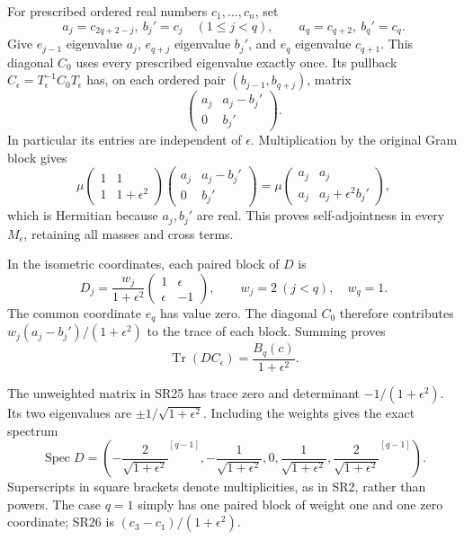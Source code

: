 For prescribed ordered real numbers \(c_1,\ldots,c_n\), set \[
a_j=c_{2q+2-j},\ b_j'=c_j\quad(1\le j<q),\qquad
a_q=c_{q+2},\ b_q'=c_q.
\tag{SR22}
\] Give \(e_{j-1}\) eigenvalue \(a_j\), \(e_{q+j}\) eigenvalue \(b_j'\), and \(e_q\) eigenvalue \(c_{q+1}\). This diagonal \(C_0\) uses every prescribed eigenvalue exactly once. Its pullback \(C_\epsilon=T_\epsilon^{-1}C_0T_\epsilon\) has, on each ordered pair \((b_{j-1},b_{q+j})\), matrix \[
\begin{pmatrix}a_j&a_j-b_j'\\0&b_j'\end{pmatrix}.
\tag{SR23}
\] In particular its entries are independent of \(\epsilon\). Multiplication by the original Gram block gives \[
\mu\begin{pmatrix}1&1\\1&1+\epsilon^2\end{pmatrix}
\begin{pmatrix}a_j&a_j-b_j'\\0&b_j'\end{pmatrix}
=\mu\begin{pmatrix}a_j&a_j\\a_j&a_j+\epsilon^2b_j'\end{pmatrix},
\tag{SR24}
\] which is Hermitian because \(a_j,b_j'\) are real. This proves self-adjointness in every \(M_\epsilon\), retaining all masses and cross terms.

In the isometric coordinates, each paired block of \(D\) is \[
D_j=\frac{w_j}{1+\epsilon^2}
\begin{pmatrix}1&\epsilon\\\epsilon&-1\end{pmatrix},\qquad
w_j=2\ (j<q),\quad w_q=1.
\tag{SR25}
\] The common coordinate \(e_q\) has value zero. The diagonal \(C_0\) therefore contributes \(w_j(a_j-b_j')/(1+\epsilon^2)\) to the trace of each block. Summing proves \[
\operatorname{Tr}(DC_\epsilon)=\frac{B_q(c)}{1+\epsilon^2}.
\tag{SR26}
\]

The unweighted matrix in SR25 has trace zero and determinant \(-1/(1+\epsilon^2)\). Its two eigenvalues are \(\pm1/\sqrt{1+\epsilon^2}\). Including the weights gives the exact spectrum \[
\operatorname{Spec}D
=\left(
-\frac{2}{\sqrt{1+\epsilon^2}}^{[q-1]},
-\frac{1}{\sqrt{1+\epsilon^2}},0,
\frac{1}{\sqrt{1+\epsilon^2}},
\frac{2}{\sqrt{1+\epsilon^2}}^{[q-1]}
\right).
\tag{SR27}
\] Superscripts in square brackets denote multiplicities, as in SR2, rather than powers. The case \(q=1\) simply has one paired block of weight one and one zero coordinate; SR26 is \((c_3-c_1)/(1+\epsilon^2)\).


